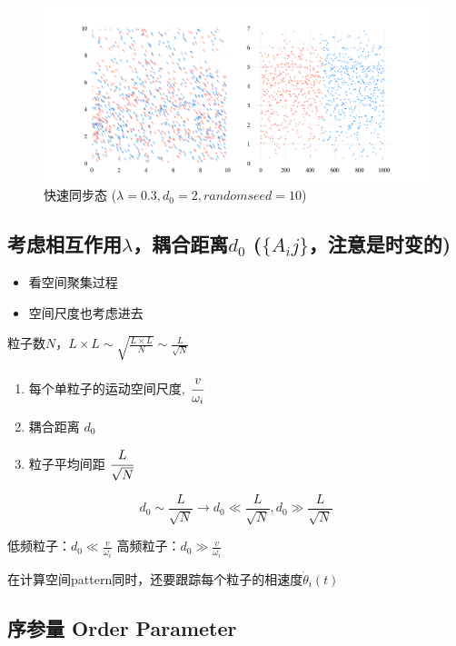 \documentclass{article}
\begin{document}
\begin{figure}[H]
	\centering
	\includegraphics[width=\textwidth]{./figs/CorrectCoupling_uniform_0.300_2.00_10_radius.png}
	\vspace{-1cm}
	\caption{快速同步态 ($\lambda=0.3, d_0=2, random seed=10$)}
	\label{fig:fig22.4}
\end{figure}

\subsection{考虑相互作用$\lambda$，耦合距离$d_0$ ($\{A_ij\}$，注意是时变的)}

\begin{itemize}
    \item 看空间聚集过程
    \item 空间尺度也考虑进去
\end{itemize}

粒子数$N$，$L\times L\sim \sqrt{\frac{L\times L}{N}}\sim \frac{L}{\sqrt{N}}$

\begin{enumerate}
    \item 每个单粒子的运动空间尺度, $\cfrac{v}{\omega_i}$
    \item 耦合距离 $d_0$
    \item 粒子平均间距 $\cfrac{L}{\sqrt{N}}$
\end{enumerate}

$$
d_0\sim \frac{L}{\sqrt{N}}\rightarrow d_0\ll \frac{L}{\sqrt{N}}, d_0\gg \frac{L}{\sqrt{N}}
$$

低频粒子：$d_0\ll \frac{v}{\omega _i}$
高频粒子：$d_0\gg \frac{v}{\omega _i}$

在计算空间pattern同时，还要跟踪每个粒子的相速度$\dot{\theta}_i(t)$

\newpage
\subsection{序参量 Order Parameter}
\end{document}
